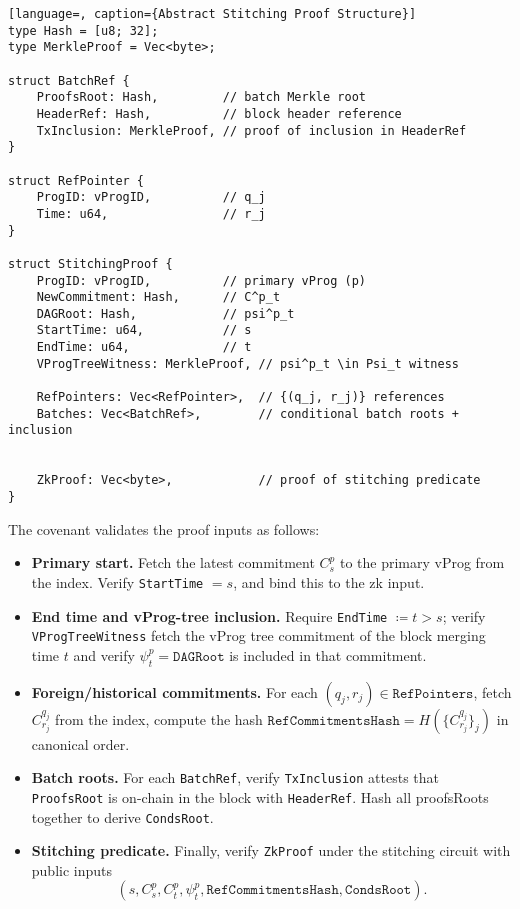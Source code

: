 \documentclass[onecolumn, 9pt, a4paper]{extarticle}
\begin{document}
\begin{lstlisting}[language=, caption={Abstract Stitching Proof Structure}]
type Hash = [u8; 32];
type MerkleProof = Vec<byte>;

struct BatchRef {
    ProofsRoot: Hash,         // batch Merkle root
    HeaderRef: Hash,          // block header reference
    TxInclusion: MerkleProof, // proof of inclusion in HeaderRef
}

struct RefPointer {
    ProgID: vProgID,          // q_j
    Time: u64,                // r_j
}

struct StitchingProof {
    ProgID: vProgID,          // primary vProg (p)
    NewCommitment: Hash,      // C^p_t
    DAGRoot: Hash,            // psi^p_t
    StartTime: u64,           // s
    EndTime: u64,             // t
    VProgTreeWitness: MerkleProof, // psi^p_t \in Psi_t witness

    RefPointers: Vec<RefPointer>,  // {(q_j, r_j)} references
    Batches: Vec<BatchRef>,        // conditional batch roots + inclusion


    ZkProof: Vec<byte>,            // proof of stitching predicate
}
\end{lstlisting}

The covenant validates the proof inputs as follows:
\begin{itemize}
  \item \textbf{Primary start.} Fetch the latest commitment $ C^p_s$ to the primary vProg from the index. Verify \texttt{StartTime} $=s$, and bind this to the zk input.
  \item \textbf{End time and vProg-tree inclusion.} Require \texttt{EndTime} $\coloneqq t>s$; verify \texttt{VProgTreeWitness} fetch the vProg tree commitment of the block merging  time  $t$  and verify $\psi^p_t=\texttt{DAGRoot}$ is included in that commitment.
  \item \textbf{Foreign/historical commitments.} For each $(q_j,r_j)\in\texttt{RefPointers}$, fetch $C^{q_j}_{r_j}$ from the index, compute the hash
  $\texttt{RefCommitmentsHash}=H(\{C^{q_j}_{r_j}\}_j)$ in canonical order.
  \item \textbf{Batch roots.} For each \texttt{BatchRef}, verify \texttt{TxInclusion} attests that \texttt{ProofsRoot} is on-chain in the block with \texttt{HeaderRef}. Hash all proofsRoots together to derive \texttt{CondsRoot}.
  \item \textbf{Stitching predicate.} Finally, verify \texttt{ZkProof} under the stitching circuit with public inputs 
  $$(s,C^p_s,C^p_t,\psi^p_t,\texttt{RefCommitmentsHash},\texttt{CondsRoot}).$$
\end{itemize}
\end{document}

